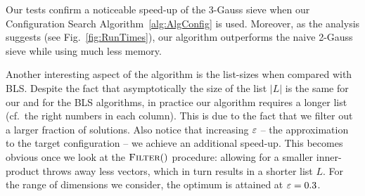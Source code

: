 Our tests confirm a noticeable speed-up of the 3-Gauss sieve when our Configuration Search Algorithm~\ref{alg:AlgConfig} is used. Moreover, as the analysis suggests (see Fig.~\ref{fig:RunTimes}), our algorithm outperforms the naive 2-Gauss sieve while using much less memory. 

Another interesting aspect of the algorithm is the list-sizes when compared with BLS. Despite the fact that asymptotically the size of the list $|L|$ is the same for our and for the BLS algorithms, in practice our algorithm requires a longer list (cf.\ the right numbers in each column). This is due to the fact that we filter out a larger fraction of solutions. Also notice that increasing $\varepsilon$ -- the approximation to the target configuration -- we achieve an additional speed-up. This becomes obvious once we look at the $\Call{Filter}$ procedure: allowing for a smaller inner-product throws away less vectors, which in turn results in a shorter list $L$. For the range of dimensions we consider, the optimum is attained at $\varepsilon=0.3$.

